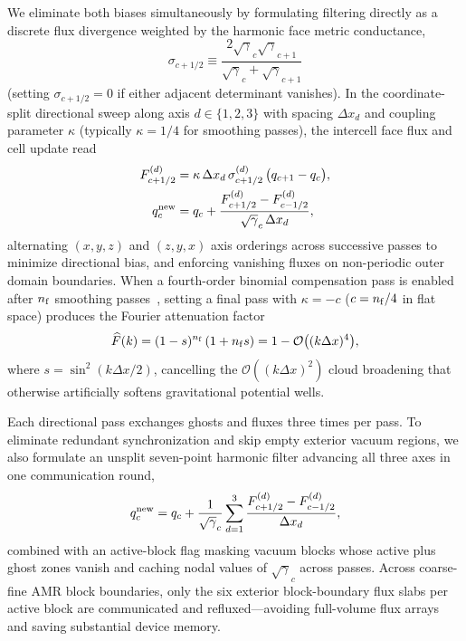 We eliminate both biases simultaneously by formulating filtering directly as a discrete flux divergence weighted by the harmonic face metric conductance,
\begin{equation}\label{eq:harmonic_cond}
\sigma_{c+1/2} \equiv \frac{2\sqrt{\gamma}_c \sqrt{\gamma}_{c+1}}{\sqrt{\gamma}_c + \sqrt{\gamma}_{c+1}}
\end{equation}
(setting $\sigma_{c+1/2} = 0$ if either adjacent determinant vanishes). In the coordinate-split directional sweep along axis $d \in \{1, 2, 3\}$ with spacing $\Delta x_d$ and coupling parameter $\kappa$ (typically $\kappa = 1/4$ for smoothing passes), the intercell face flux and cell update read
\begin{align}\label{eq:mcons_dir}
F_{c+1/2}^{(d)} &= \kappa\,\Delta x_d\,\sigma_{c+1/2}^{(d)}\,\bigl(q_{c+1} - q_c\bigr), \nonumber\\
q_c^{\rm new} &= q_c + \frac{F_{c+1/2}^{(d)} - F_{c-1/2}^{(d)}}{\sqrt{\gamma}_c\,\Delta x_d},
\end{align}
alternating $(x, y, z)$ and $(z, y, x)$ axis orderings across successive passes to minimize directional bias, and enforcing vanishing fluxes on non-periodic outer domain boundaries. When a fourth-order binomial compensation pass is enabled after $n_{\rm f}$ smoothing passes~\cite{1991ppcs.book.....B,Wu:2026nrpic}, setting a final pass with $\kappa = -c$ ($c = n_{\rm f}/4$ in flat space) produces the Fourier attenuation factor
\begin{equation}\label{eq:comp_response}
\widehat{F}(k) = (1 - s)^{n_{\rm f}}\,(1 + n_{\rm f} s) = 1 - \mathcal{O}\bigl((k\Delta x)^4\bigr),
\end{equation}
where $s = \sin^2(k\Delta x/2)$, cancelling the $\mathcal{O}((k\Delta x)^2)$ cloud broadening that otherwise artificially softens gravitational potential wells.

Each directional pass exchanges ghosts and fluxes three times per pass. To eliminate redundant synchronization and skip empty exterior vacuum regions, we also formulate an unsplit seven-point harmonic filter advancing all three axes in one communication round,
\begin{equation}\label{eq:mcons_unsplit}
q_c^{\rm new} = q_c + \frac{1}{\sqrt{\gamma}_c}\sum_{d=1}^{3} \frac{F_{c+1/2}^{(d)} - F_{c-1/2}^{(d)}}{\Delta x_d},
\end{equation}
combined with an active-block flag masking vacuum blocks whose active plus ghost zones vanish and caching nodal values of $\sqrt{\gamma}_c$ across passes. Across coarse-fine AMR block boundaries, only the six exterior block-boundary flux slabs per active block are communicated and refluxed—avoiding full-volume flux arrays and saving substantial device memory.

